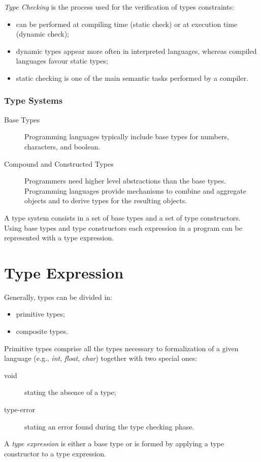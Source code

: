 \emph{Type Checking} is the process used for the verification of types constraints:
\begin{itemize}
	\item
	can be performed at compiling time (static check) or at execution time (dynamic check);
	\item
	dynamic types appear more often in interpreted languages, whereas compiled languages favour static types;
	\item
	static checking is one of the main semantic tasks performed by a compiler.
\end{itemize}
\subsubsection{Type Systems}
\begin{description}
	\item[Base Types]
	Programming languages typically include base types for numbers, characters, and boolean.
	\item[Compound and Constructed Types]
	Programmers need higher level abstractions than the base types.
	Programming languages provide mechanisms to combine and aggregate objects and to derive types for the resulting objects.
\end{description}
A type system consists in a set of base types and a set of type constructors.
Using base types and type constructors each expression in a program can be represented with a type expression.

\section{Type Expression}
Generally, types can be divided in:
\begin{itemize}
	\item
	primitive types;
	\item
	composite types.
\end{itemize}
Primitive types comprise all the types necessary to formalization of a given language (e.g., \emph{int}, \emph{float}, \emph{char}) together with two special ones:
\begin{description}
	\item[void]
	stating the absence of a type;
	\item[type-error]
	stating an error found during the type checking phase.
\end{description}

A \emph{type expression} is either a base type or is formed by applying a type constructor to a type expression.

